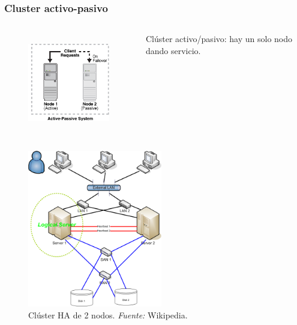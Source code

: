 \documentclass{beamer}
\begin{document}

\begin{frame}
\frametitle{Cluster activo-pasivo}

\begin{columns}

\column[t]{4cm}

\begin{figure}[h]

\begin{center}
  \centering
  \includegraphics[height=1.7in]{figs/passive-cluster.png}
\end{center}
\end{figure}


\column[t]{5cm}
\vspace{2cm}

\alert{Clúster activo/pasivo}: hay un solo nodo dando servicio.

\end{columns}


\end{frame}



\begin{frame}

\begin{figure}[h]

\begin{center}
  \centering
  \includegraphics[height=2.7in]{figs/2nodeHAcluster.png}
  \caption{Clúster HA de 2 nodos. \textit{Fuente:} Wikipedia.}
\end{center}
\end{figure}

\end{frame}
\end{document}
